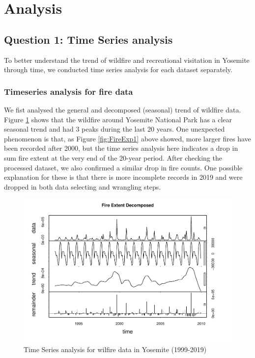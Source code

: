 \documentclass[
  12pt,
]{article}
\begin{document}
\newpage

\hypertarget{analysis}{%
\section{Analysis}\label{analysis}}

\hypertarget{question-1-time-series-analysis}{%
\subsection{Question 1: Time Series analysis}\label{question-1-time-series-analysis}}

To better understand the trend of wildfire and recreational visitation in Yosemite through time, we conducted time series analysis for each dataset separately.

\hypertarget{timeseries-analysis-for-fire-data}{%
\subsubsection{Timeseries analysis for fire data}\label{timeseries-analysis-for-fire-data}}

We fist analysed the general and decomposed (seasonal) trend of wildfire data.
Figure \ref{fig:TSplotfire} shows that the wildfire around Yosemite National Park has a clear seasonal trend and had 3 peaks during the last 20 years. One unexpected phenomenon is that, as Figure \ref{fig:FireExp1} above showed, more larger fires have been recorded after 2000, but the time series analysis here indicates a drop in sum fire extent at the very end of the 20-year period. After checking the processed dataset, we also confirmed a similar drop in fire counts. One possible explanation for these is that there is more incomplete records in 2019 and were dropped in both data selecting and wrangling steps.

\begin{figure}
\centering
\includegraphics{CodeFinal_files/figure-latex/TSplotfire-1.pdf}
\caption{\label{fig:TSplotfire}Time Series analysis for wilfire data in Yosemite (1999-2019)}
\end{figure}
\end{document}
